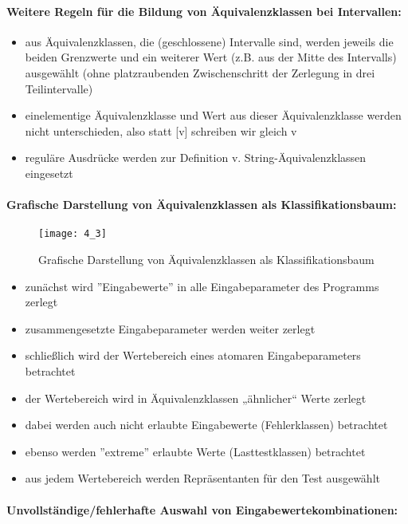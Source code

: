 \paragraph{Weitere Regeln für die Bildung von Äquivalenzklassen bei Intervallen:}
\begin{itemize}
	\item aus Äquivalenzklassen, die (geschlossene) Intervalle sind, werden jeweils die beiden Grenzwerte und ein weiterer Wert (z.B. aus der Mitte des Intervalls) ausgewählt (ohne platzraubenden Zwischenschritt der Zerlegung in drei Teilintervalle)
	\item einelementige Äquivalenzklasse und Wert aus dieser Äquivalenzklasse werden nicht unterschieden, also statt [v] schreiben wir gleich v
	\item reguläre Ausdrücke werden zur Definition v. String-Äquivalenzklassen eingesetzt
\end{itemize}

\paragraph{Grafische Darstellung von Äquivalenzklassen als Klassifikationsbaum:}

\begin{figure}[h]
	\centering
	\caption{Grafische Darstellung von Äquivalenzklassen als Klassifikationsbaum}
	\texttt{[image: 4\_3]}
	
\end{figure}
\begin{itemize}
	\item zunächst wird ''Eingabewerte'' in alle Eingabeparameter des Programms zerlegt
	\item zusammengesetzte Eingabeparameter werden weiter zerlegt
	\item schließlich wird der Wertebereich eines atomaren Eingabeparameters betrachtet
	\item der Wertebereich wird in Äquivalenzklassen „ähnlicher“ Werte zerlegt
	\item dabei werden auch nicht erlaubte Eingabewerte (Fehlerklassen) betrachtet
	\item ebenso werden ''extreme'' erlaubte Werte (Lasttestklassen) betrachtet
	\item aus jedem Wertebereich werden Repräsentanten für den Test ausgewählt
\end{itemize}

\paragraph{Unvollständige/fehlerhafte Auswahl von Eingabewertekombinationen:}

